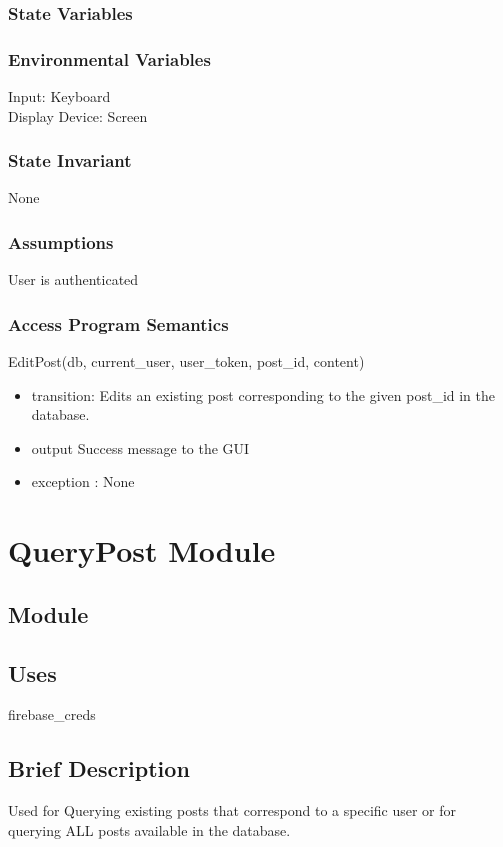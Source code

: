 \documentclass[12pt, titlepage]{article}
\begin{document}
\subsubsection{State Variables}

\subsubsection{Environmental Variables}
Input: Keyboard\\
Display Device: Screen

\subsubsection{State Invariant}
None

\subsubsection{Assumptions}
User is authenticated

\subsubsection{Access Program Semantics}
EditPost(db, current\_user, user\_token, post\_id, content)
\begin{itemize}
    \item transition: Edits an existing post corresponding to the given post\_id in the database.
    \item output Success message to the GUI
    \item exception : None
\end{itemize}








\newpage
\section* {QueryPost Module}

\subsection*{Module}

\subsection* {Uses}
firebase\_creds

\subsection* {Brief Description}
Used for Querying existing posts that correspond to a specific user or for querying ALL posts available in the database.
\end{document}

